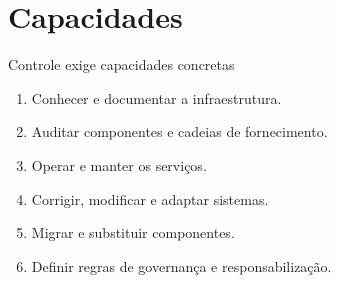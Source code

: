 \section{Capacidades}

\begin{frame}{Controle exige capacidades concretas}
  \begin{enumerate}
    \item Conhecer e documentar a infraestrutura.
    \item Auditar componentes e cadeias de fornecimento.
    \item Operar e manter os serviços.
    \item Corrigir, modificar e adaptar sistemas.
    \item Migrar e substituir componentes.
    \item Definir regras de governança e responsabilização.
  \end{enumerate}
\end{frame}

